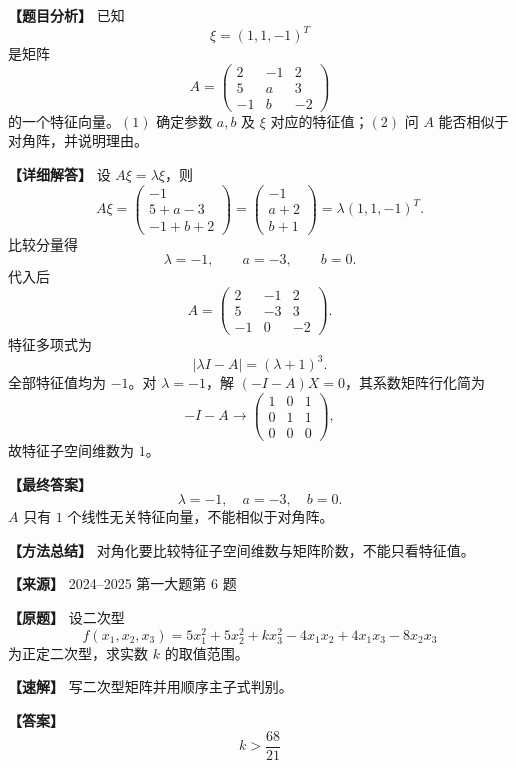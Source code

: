 \documentclass[11pt,a4paper,UTF8]{ctexart}
\begin{document}
\begin{answerbox}
\textbf{【题目分析】} 已知
\[
\xi=(1,1,-1)^T
\]
是矩阵
\[
A=\begin{pmatrix}2&-1&2\\5&a&3\\-1&b&-2\end{pmatrix}
\]
的一个特征向量。$(1)$ 确定参数 $a,b$ 及 $\xi$ 对应的特征值；$(2)$ 问 $A$ 能否相似于对角阵，并说明理由。

\textbf{【详细解答】} 设 $A\xi=\lambda\xi$，则
\[
A\xi=\begin{pmatrix}-1\\5+a-3\\-1+b+2\end{pmatrix}
=\begin{pmatrix}-1\\a+2\\b+1\end{pmatrix}
=\lambda(1,1,-1)^T.
\]
比较分量得
\[
\lambda=-1,\qquad a=-3,\qquad b=0.
\]
代入后
\[
A=\begin{pmatrix}2&-1&2\\5&-3&3\\-1&0&-2\end{pmatrix}.
\]
特征多项式为
\[
|\lambda I-A|=(\lambda+1)^3.
\]
全部特征值均为 $-1$。对 $\lambda=-1$，解 $(-I-A)X=0$，其系数矩阵行化简为
\[
-I-A\to
\begin{pmatrix}
1&0&1\\
0&1&1\\
0&0&0
\end{pmatrix},
\]
故特征子空间维数为 $1$。

\textbf{【最终答案】}
\[
\lambda=-1,\quad a=-3,\quad b=0.
\]
$A$ 只有 $1$ 个线性无关特征向量，不能相似于对角阵。

\textbf{【方法总结】} 对角化要比较特征子空间维数与矩阵阶数，不能只看特征值。
\end{answerbox}

\begin{answerbox}
\textbf{【来源】} 2024--2025 第一大题第 6 题

\textbf{【原题】}
设二次型
\[
f(x_1,x_2,x_3)=5x_1^2+5x_2^2+kx_3^2-4x_1x_2+4x_1x_3-8x_2x_3
\]
为正定二次型，求实数 $k$ 的取值范围。

\textbf{【速解】}
写二次型矩阵并用顺序主子式判别。

\textbf{【答案】}
\[k>\frac{68}{21}\]
\end{answerbox}
\end{document}

